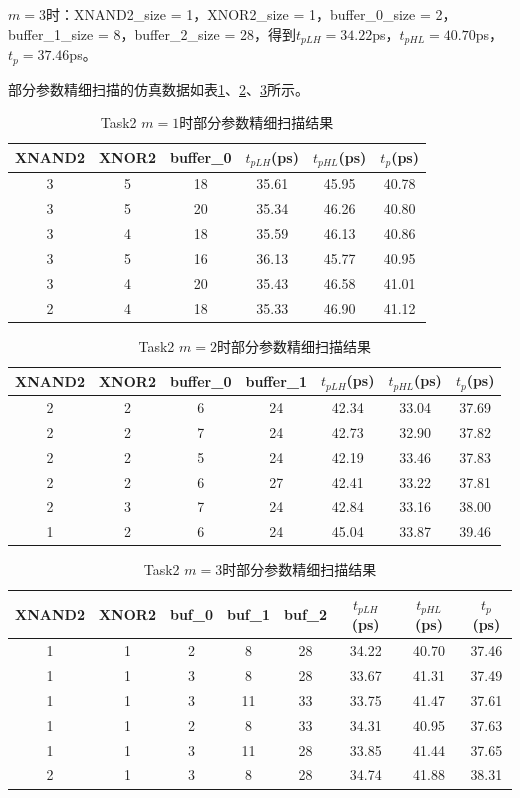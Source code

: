 \documentclass[UTF8,12pt,a4paper]{ctexart}
\begin{document}
$m = 3$时：XNAND2\_size = 1，XNOR2\_size = 1，buffer\_0\_size = 2，buffer\_1\_size = 8，buffer\_2\_size = 28，得到$t_{pLH} = 34.22$ps，$t_{pHL} = 40.70$ps，$t_p = 37.46$ps。

部分参数精细扫描的仿真数据如表\ref{tab:task2_m1_data}、\ref{tab:task2_m2_data}、\ref{tab:task2_m3_data}所示。

\begin{table}[htbp]
\centering
\caption{Task2 $m=1$时部分参数精细扫描结果}
\label{tab:task2_m1_data}
\begin{tabular}{|c|c|c|c|c|c|}
\hline
XNAND2 & XNOR2 & buffer\_0 & $t_{pLH}$(ps) & $t_{pHL}$(ps) & $t_p$(ps) \\
\hline
3 & 5 & 18 & 35.61 & 45.95 & 40.78 \\
3 & 5 & 20 & 35.34 & 46.26 & 40.80 \\
3 & 4 & 18 & 35.59 & 46.13 & 40.86 \\
3 & 5 & 16 & 36.13 & 45.77 & 40.95 \\
3 & 4 & 20 & 35.43 & 46.58 & 41.01 \\
2 & 4 & 18 & 35.33 & 46.90 & 41.12 \\
\hline
\end{tabular}
\end{table}

\begin{table}[htbp]
\centering
\caption{Task2 $m=2$时部分参数精细扫描结果}
\label{tab:task2_m2_data}
\begin{tabular}{|c|c|c|c|c|c|c|}
\hline
XNAND2 & XNOR2 & buffer\_0 & buffer\_1 & $t_{pLH}$(ps) & $t_{pHL}$(ps) & $t_p$(ps) \\
\hline
2 & 2 & 6 & 24 & 42.34 & 33.04 & 37.69 \\
2 & 2 & 7 & 24 & 42.73 & 32.90 & 37.82 \\
2 & 2 & 5 & 24 & 42.19 & 33.46 & 37.83 \\
2 & 2 & 6 & 27 & 42.41 & 33.22 & 37.81 \\
2 & 3 & 7 & 24 & 42.84 & 33.16 & 38.00 \\
1 & 2 & 6 & 24 & 45.04 & 33.87 & 39.46 \\
\hline
\end{tabular}
\end{table}

\begin{table}[htbp]
\centering
\caption{Task2 $m=3$时部分参数精细扫描结果}
\label{tab:task2_m3_data}
\begin{tabular}{|c|c|c|c|c|c|c|c|}
\hline
XNAND2 & XNOR2 & buf\_0 & buf\_1 & buf\_2 & $t_{pLH}$(ps) & $t_{pHL}$(ps) & $t_p$(ps) \\
\hline
1 & 1 & 2 & 8 & 28 & 34.22 & 40.70 & 37.46 \\
1 & 1 & 3 & 8 & 28 & 33.67 & 41.31 & 37.49 \\
1 & 1 & 3 & 11 & 33 & 33.75 & 41.47 & 37.61 \\
1 & 1 & 2 & 8 & 33 & 34.31 & 40.95 & 37.63 \\
1 & 1 & 3 & 11 & 28 & 33.85 & 41.44 & 37.65 \\
2 & 1 & 3 & 8 & 28 & 34.74 & 41.88 & 38.31 \\
\hline
\end{tabular}
\end{table}
\end{document}
